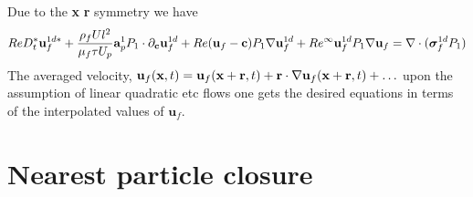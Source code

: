 \documentclass[11pt]{My_preprint}
\begin{document}
Due to the \textbf{x} \textbf{r} symmetry we have 
\begin{align*}
    Re D_t^*  \textbf{u}_f^{1d*}  
    +  \frac{\rho_f U l^2 }{\mu_f \tau U_p}  \textbf{a}_p^1  P_1   \cdot \partial_\textbf{c} \textbf{u}_f^{1d} 
    + Re ( \textbf{u}_f -   \textbf{c}  ) P_1 \mathbf{\nabla} \textbf{u}_f^{1d}
    + Re^\infty \textbf{u}_f^{1d} P_1 \mathbf{\nabla}\textbf{u}_f
    = 
    \mathbf{\nabla}\cdot ( \bm\sigma_f^{1d} P_1)
\end{align*}
The averaged velocity, 
$\textbf{u}_f(\textbf{x},t) = \textbf{u}_f(\textbf{x}+ \textbf{r},t) + \textbf{r}\cdot \mathbf{\nabla} \textbf{u}_f(\textbf{x}+ \textbf{r},t)+ \ldots$ upon the assumption of linear quadratic etc flows one gets the desired equations in terms of the interpolated values of $\textbf{u}_f$. 

\section{Nearest particle closure}





\appendix
\end{document}
